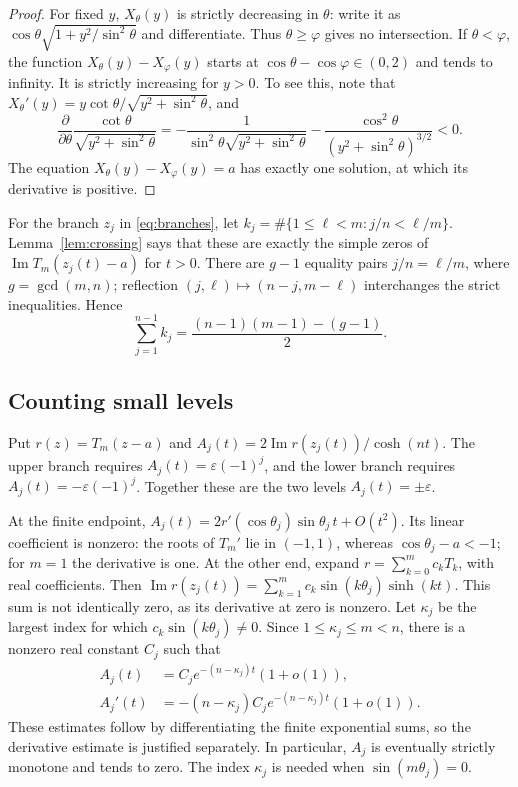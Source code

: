\documentclass[a4paper]{amsart}
\theoremstyle{remark}
\newcommand{\eps}{\varepsilon}
\DeclareMathOperator{\Ima}{Im}
\begin{document}
\begin{proof}
For fixed \(y\), \(X_\theta(y)\) is strictly decreasing in \(\theta\):
write it as
\(\cos\theta\sqrt{1+y^2/\sin^2\theta}\) and differentiate.
Thus \(\theta\ge\varphi\) gives no intersection.
If \(\theta<\varphi\), the function
\(X_\theta(y)-X_\varphi(y)\) starts at
\(\cos\theta-\cos\varphi\in(0,2)\) and tends to infinity.
It is strictly increasing for \(y>0\). To see this, note that
\(X_\theta'(y)=y\cot\theta/\sqrt{y^2+\sin^2\theta}\), and
\[
 \frac{\partial}{\partial\theta}
 \frac{\cot\theta}{\sqrt{y^2+\sin^2\theta}}
 =
 -\frac{1}{\sin^2\theta\sqrt{y^2+\sin^2\theta}}
 -\frac{\cos^2\theta}{(y^2+\sin^2\theta)^{3/2}}<0.
\]
The equation \(X_\theta(y)-X_\varphi(y)=a\) has exactly one
solution, at which its derivative is positive.
\end{proof}

For the branch \(z_j\) in \eqref{eq:branches}, let
\(k_j=\#\{1\le\ell<m:j/n<\ell/m\}\). Lemma~\ref{lem:crossing}
says that these are exactly the simple zeros of
\(\Ima T_m(z_j(t)-a)\) for \(t>0\). There are \(g-1\) equality
pairs \(j/n=\ell/m\), where \(g=\gcd(m,n)\); reflection
\((j,\ell)\mapsto(n-j,m-\ell)\) interchanges the strict inequalities.
Hence
\begin{equation}\label{eq:crossingcount}
 \sum_{j=1}^{n-1}k_j=
 \frac{(n-1)(m-1)-(g-1)}2.
\end{equation}

\subsection{Counting small levels}
Put \(r(z)=T_m(z-a)\) and
\(A_j(t)=2\Ima r(z_j(t))/\cosh(nt)\).
The upper branch requires \(A_j(t)=\eps(-1)^j\), and the lower
branch requires \(A_j(t)=-\eps(-1)^j\).
Together these are the two levels \(A_j(t)=\pm\eps\).

At the finite endpoint,
\(A_j(t)=2r'(\cos\theta_j)\sin\theta_j\,t+O(t^2)\).
Its linear coefficient is nonzero: the roots of \(T_m'\) lie in
\((-1,1)\), whereas \(\cos\theta_j-a<-1\); for \(m=1\) the
derivative is one. At the other end, expand
\(r=\sum_{k=0}^m c_kT_k\), with real coefficients.
Then
\(\Ima r(z_j(t))=\sum_{k=1}^m c_k\sin(k\theta_j)\sinh(kt)\).
This sum is not identically zero, as its derivative at zero is
nonzero. Let \(\kappa_j\) be the largest index for which
\(c_k\sin(k\theta_j)\ne0\). Since \(1\le\kappa_j\le m<n\),
there is a nonzero real constant \(C_j\) such that
\begin{equation}\label{eq:endbehavior}
 \begin{split}
 A_j(t)&=C_j e^{-(n-\kappa_j)t}(1+o(1)),\\
 A_j'(t)&=-(n-\kappa_j)C_j e^{-(n-\kappa_j)t}(1+o(1)).
 \end{split}
\end{equation}
These estimates follow by differentiating the finite exponential
sums, so the derivative estimate is justified separately.
In particular, \(A_j\) is eventually strictly monotone and tends
to zero. The index \(\kappa_j\) is needed when
\(\sin(m\theta_j)=0\).
\end{document}
